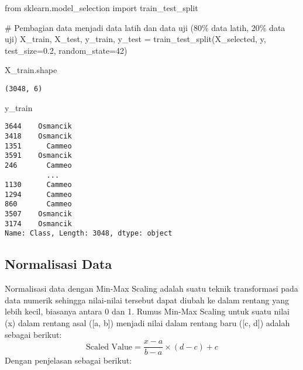\documentclass[
  letterpaper,
]{krantz}
\makeatletter
\newenvironment{Shaded}{\begin{snugshade}}{\end{snugshade}}
\newcommand{\CommentTok}[1]{\textcolor[rgb]{0.37,0.37,0.37}{#1}}
\newcommand{\DecValTok}[1]{\textcolor[rgb]{0.68,0.00,0.00}{#1}}
\newcommand{\FloatTok}[1]{\textcolor[rgb]{0.68,0.00,0.00}{#1}}
\newcommand{\ImportTok}[1]{\textcolor[rgb]{0.00,0.46,0.62}{#1}}
\newcommand{\NormalTok}[1]{\textcolor[rgb]{0.00,0.23,0.31}{#1}}
\newcommand{\OperatorTok}[1]{\textcolor[rgb]{0.37,0.37,0.37}{#1}}
\newenvironment{kframe}{%
\medskip{}
\setlength{\fboxsep}{.8em}
 \def\at@end@of@kframe{}%
 \ifinner\ifhmode%
  \def\at@end@of@kframe{\end{minipage}}%
  \begin{minipage}{\columnwidth}%
 \fi\fi%
 \def\FrameCommand##1{\hskip\@totalleftmargin \hskip-\fboxsep
 \colorbox{shadecolor}{##1}\hskip-\fboxsep
     \hskip-\linewidth \hskip-\@totalleftmargin \hskip\columnwidth}%
 \MakeFramed {\advance\hsize-\width
   \@totalleftmargin\z@ \linewidth\hsize
   \@setminipage}}%
 {\par\unskip\endMakeFramed%
 \at@end@of@kframe}
\renewenvironment{Shaded}{\begin{kframe}}{\end{kframe}}
\makeatother
\begin{document}
\begin{Shaded}
\begin{Highlighting}[]
\ImportTok{from}\NormalTok{ sklearn.model\_selection }\ImportTok{import}\NormalTok{ train\_test\_split}

\CommentTok{\# Pembagian data menjadi data latih dan data uji (80\% data latih, 20\% data uji)}
\NormalTok{X\_train, X\_test, y\_train, y\_test }\OperatorTok{=}\NormalTok{ train\_test\_split(X\_selected, y, test\_size}\OperatorTok{=}\FloatTok{0.2}\NormalTok{, random\_state}\OperatorTok{=}\DecValTok{42}\NormalTok{)}
\end{Highlighting}
\end{Shaded}

\begin{Shaded}
\begin{Highlighting}[]
\NormalTok{X\_train.shape}
\end{Highlighting}
\end{Shaded}

\begin{verbatim}
(3048, 6)
\end{verbatim}

\begin{Shaded}
\begin{Highlighting}[]
\NormalTok{y\_train}
\end{Highlighting}
\end{Shaded}

\begin{verbatim}
3644    Osmancik
3418    Osmancik
1351      Cammeo
3591    Osmancik
246       Cammeo
          ...   
1130      Cammeo
1294      Cammeo
860       Cammeo
3507    Osmancik
3174    Osmancik
Name: Class, Length: 3048, dtype: object
\end{verbatim}

\hypertarget{normalisasi-data}{%
\subsection{Normalisasi Data}\label{normalisasi-data}}

Normalisasi data dengan Min-Max Scaling adalah suatu teknik transformasi
pada data numerik sehingga nilai-nilai tersebut dapat diubah ke dalam
rentang yang lebih kecil, biasanya antara 0 dan 1. Rumus Min-Max Scaling
untuk suatu nilai (x) dalam rentang asal ({[}a, b{]}) menjadi nilai
dalam rentang baru ({[}c, d{]}) adalah sebagai berikut: \[
\
\text{Scaled Value} = \frac{x - a}{b - a} \times (d - c) + c
\
\] Dengan penjelasan sebagai berikut:
\end{document}
